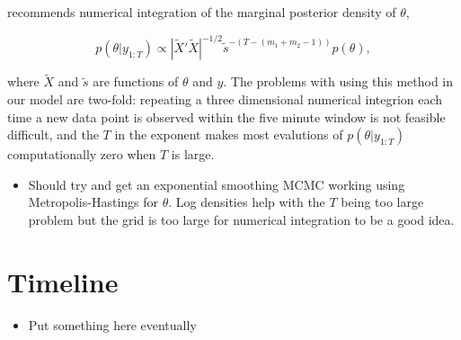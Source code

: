 \documentclass[12pt,a4paper]{article}%
\numberwithin{equation}{section}
\begin{document}
\citet{Forbes2000} recommends numerical integration of the marginal posterior density of $\theta$,

\begin{equation}
\label{exp-sm-marginal}
p(\theta | y_{1:T}) \propto \left| \widetilde{X}' \widetilde{X} \right|^{-1/2} \tilde{s}^{-(T-(m_1 + m_2 - 1))} p(\theta),
\end{equation}

where $\widetilde{X}$ and $\tilde{s}$ are functions of $\theta$ and $y$. The problems with using this method in our model are two-fold: repeating a three dimensional numerical integrion each time a new data point is observed within the five minute window is not feasible difficult, and the $T$ in the exponent makes most evalutions of $p(\theta | y_{1:T})$ computationally zero when $T$ is large. 

\begin{itemize}
\item Should try and get an exponential smoothing MCMC working using Metropolis-Hastings for $\theta$. Log densities help with the $T$ being too large problem but the grid is too large for numerical integration to be a good idea.
\end{itemize}

\section{Timeline}
\begin{itemize}
\item Put something here eventually
\end{itemize}



\end{document}
